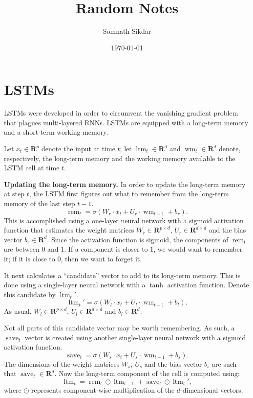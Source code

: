 \documentclass[12pt]{article}
\title{Random Notes}
\author{Somnath Sikdar}
\date{\today}
\theoremstyle{definition}
\newcommand{\R}{\ensuremath{\bm{R}}}
\DeclareMathOperator{\rem}{rem}
\DeclareMathOperator{\save}{save}
\DeclareMathOperator{\ltm}{ltm}
\DeclareMathOperator{\wm}{wm}
\begin{document}
\section{LSTMs}
LSTMs were developed in order to circumvent the vanishing gradient problem that 
plagues multi-layered RNNs. LSTMs are equipped with a long-term memory and a 
short-term working memory. 

Let $x_t \in \R^{p}$ denote the input at time $t$; let $\ltm_{t} \in \R^{d}$ 
and $\wm_{t} \in \R^{d}$ denote, respectively, the long-term memory and the 
working memory available to the LSTM cell at time $t$. 

\medskip

\noindent \textbf{Updating the long-term memory.} In order to update the long-term
memory at step $t$, the LSTM first figures out what to remember from the 
long-term memory of the last step $t - 1$. 
\begin{equation}
\rem_{t} = \sigma \left ( W_r \cdot x_t + U_r \cdot \wm_{t - 1} + b_r \right ). 
\end{equation}
This is accomplished using a one-layer neural network with a sigmoid activation 
function that estimates the weight matrices $W_r \in \R^{p \times d}$, 
$U_r \in \R^{d \times d}$ and the bias vector $b_r \in \R^{d}$. Since the 
activation function is sigmoid, the components of $\rem_t$ are between $0$ and 
$1$. If a component is closer to $1$, we would want to remember it; if it is 
close to $0$, then we want to forget it. 

It next calculates a ``candidate'' vector to add to its long-term memory. This 
is done using a single-layer neural network with a $\tanh$ activation function.
Denote this candidate by $\ltm_{t}'$.
\begin{equation}
\ltm_{t}' = \sigma \left ( W_l \cdot x_t + U_l \cdot \wm_{t - 1} + b_l \right ). 
\end{equation} 
As usual, $W_l \in \R^{p \times d}$, $U_l \in \R^{d \times d}$ and $b_l \in \R^{d}$. 

Not all parts of this candidate vector may be worth remembering. As such, a 
$\save_{t}$ vector is created using another single-layer neural network with a 
sigmoid activation function. 
\begin{equation}
\save_{t} = \sigma \left ( W_s \cdot x_t + U_s \cdot \wm_{t - 1} + b_s \right ). 
\end{equation} 
The dimensions of the weight matrices $W_s$, $U_s$ and the bias vector $b_s$ 
are such that $\save_{t} \in \R^{d}$.
Now the long-term component of the cell is computed using:
\begin{equation}
\ltm_{t} = \rem_{t} \odot \ltm_{t - 1} + \save_{t} \odot \ltm_{t}',
\end{equation} 
where $\odot$ represents component-wise multiplication of the $d$-dimensional 
vectors.
\end{document}
